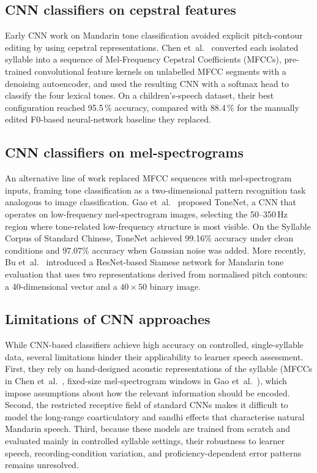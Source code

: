 \subsection{CNN classifiers on cepstral features}

Early CNN work on Mandarin tone classification avoided explicit pitch-contour editing by using cepstral representations. Chen et~al.~\cite{chen2016cnn} converted each isolated syllable into a sequence of Mel-Frequency Cepstral Coefficients (MFCCs), pre-trained convolutional feature kernels on unlabelled MFCC segments with a denoising autoencoder, and used the resulting CNN with a softmax head to classify the four lexical tones. On a children's-speech dataset, their best configuration reached 95.5\,\% accuracy, compared with 88.4\,\% for the manually edited F0-based neural-network baseline they replaced.

\subsection{CNN classifiers on mel-spectrograms}

An alternative line of work replaced MFCC sequences with mel-spectrogram inputs, framing tone classification as a two-dimensional pattern recognition task analogous to image classification. Gao et~al.~\cite{gao2019tonenet} proposed ToneNet, a CNN that operates on low-frequency mel-spectrogram images, selecting the 50--350\,Hz region where tone-related low-frequency structure is most visible. On the Syllable Corpus of Standard Chinese, ToneNet achieved 99.16\% accuracy under clean conditions and 97.07\% accuracy when Gaussian noise was added. More recently, Bu et~al.~\cite{siamese2025} introduced a ResNet-based Siamese network for Mandarin tone evaluation that uses two representations derived from normalised pitch contours: a 40-dimensional vector and a $40 \times 50$ binary image.

\subsection{Limitations of CNN approaches}

While CNN-based classifiers achieve high accuracy on controlled, single-syllable data, several limitations hinder their applicability to learner speech assessment. First, they rely on hand-designed acoustic representations of the syllable (MFCCs in Chen et~al.~\cite{chen2016cnn}, fixed-size mel-spectrogram windows in Gao et~al.~\cite{gao2019tonenet}), which impose assumptions about how the relevant information should be encoded. Second, the restricted receptive field of standard CNNs makes it difficult to model the long-range coarticulatory and sandhi effects that characterise natural Mandarin speech. Third, because these models are trained from scratch and evaluated mainly in controlled syllable settings, their robustness to learner speech, recording-condition variation, and proficiency-dependent error patterns remains unresolved.

